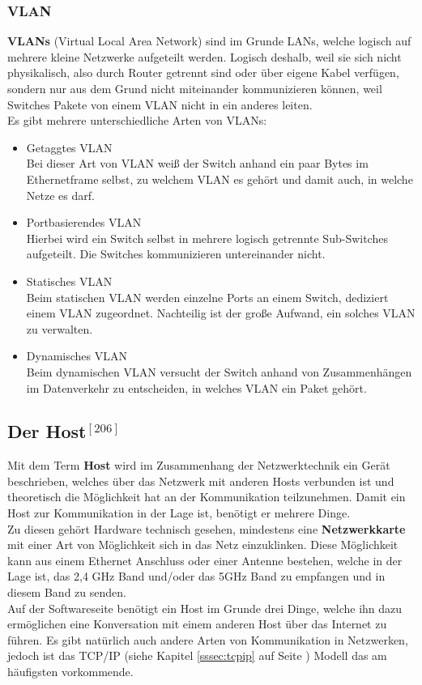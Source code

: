 \documentclass[12pt,a4paper]{report}
\begin{document}
\begin{onehalfspace}
\subsubsection{VLAN}\label{sssec:vlan}
\textbf{VLANs} (Virtual Local Area Network) sind im Grunde LANs, welche logisch auf mehrere kleine Netzwerke aufgeteilt werden. Logisch deshalb, weil sie sich nicht physikalisch, also durch Router getrennt sind oder über eigene Kabel verfügen, sondern nur aus dem Grund nicht miteinander kommunizieren können, weil Switches Pakete von einem VLAN nicht in ein anderes leiten.\\
Es gibt mehrere unterschiedliche Arten von VLANs:\\
\begin{itemize}
\item Getaggtes VLAN\\
Bei dieser Art von VLAN weiß der Switch anhand ein paar Bytes im Ethernetframe selbst, zu welchem VLAN es gehört und damit auch, in welche Netze es darf.
\item Portbasierendes VLAN\\
Hierbei wird ein Switch selbst in mehrere logisch getrennte Sub-Switches aufgeteilt. Die Switches kommunizieren untereinander nicht.
\item Statisches VLAN\\
Beim statischen VLAN werden einzelne Ports an einem Switch, dediziert einem VLAN zugeordnet. Nachteilig ist der große Aufwand, ein solches VLAN zu verwalten.
\item Dynamisches VLAN\\
Beim dynamischen VLAN versucht der Switch anhand von Zusammenhängen im Datenverkehr zu entscheiden, in welches VLAN ein Paket gehört. 
\end{itemize}

\subsection*{Der Host$^{[206]}$}
Mit dem Term \textbf{Host} wird im Zusammenhang der Netzwerktechnik ein Gerät beschrieben, welches über das Netzwerk mit anderen Hosts verbunden ist und theoretisch die Möglichkeit hat an der Kommunikation teilzunehmen. Damit ein Host zur Kommunikation in der Lage ist, benötigt er mehrere Dinge.\\
Zu diesen gehört Hardware technisch gesehen, mindestens eine \textbf{Netzwerkkarte} mit einer Art von Möglichkeit sich in das Netz einzuklinken. Diese Möglichkeit kann aus einem Ethernet Anschluss oder einer Antenne bestehen, welche in der Lage ist, das 2,4 GHz Band und/oder das 5GHz Band zu empfangen und in diesem Band zu senden.\\
Auf der Softwareseite benötigt ein Host im Grunde drei Dinge, welche ihn dazu ermöglichen eine Konversation mit einem anderen Host über das Internet zu führen. Es gibt natürlich auch andere Arten von Kommunikation in Netzwerken, jedoch ist das TCP/IP (siehe Kapitel \ref{sssec:tcpip} auf Seite \pageref{sssec:tcpip}) Modell das am häufigsten vorkommende. 


\end{onehalfspace}
\end{document}
